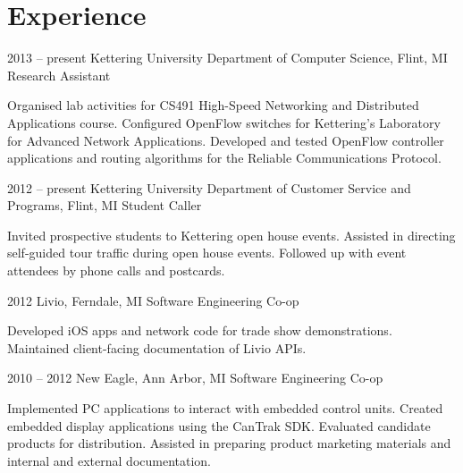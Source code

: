 \documentclass[12pt]{actccv/actccv}
\begin{document}
\address{PO Box 320426, Flint, MI 48532}

\maketitle

\section{Experience}

\begin{eventlist}
\item{2013 -- present}
     {Kettering University Department of Computer Science, Flint, MI}
     {Research Assistant}
     
     Organised lab activities for CS491 High-Speed Networking and 
     Distributed Applications course. Configured OpenFlow switches 
     for Kettering's Laboratory for Advanced Network Applications.
     Developed and tested OpenFlow controller applications and routing algorithms 
     for the Reliable Communications Protocol.

\item{2012 -- present}
     {Kettering University Department of Customer Service and Programs, Flint, MI}
     {Student Caller}
     
     Invited prospective students to Kettering open house events.
     Assisted in directing self-guided tour traffic during open house events.
     Followed up with event attendees by phone calls and postcards.
     
\item{2012}
     {Livio, Ferndale, MI}
     {Software Engineering Co-op}
     
     Developed iOS apps and network code for trade show demonstrations.
     Maintained client-facing documentation of Livio APIs.
     
\item{2010 -- 2012}
     {New Eagle, Ann Arbor, MI}
     {Software Engineering Co-op}
     
     Implemented PC applications to interact with embedded control units.
     Created embedded display applications using the CanTrak SDK.
     Evaluated candidate products for distribution.
     Assisted in preparing product marketing materials and internal and 
     external documentation.
     
\end{eventlist}
\end{document}
